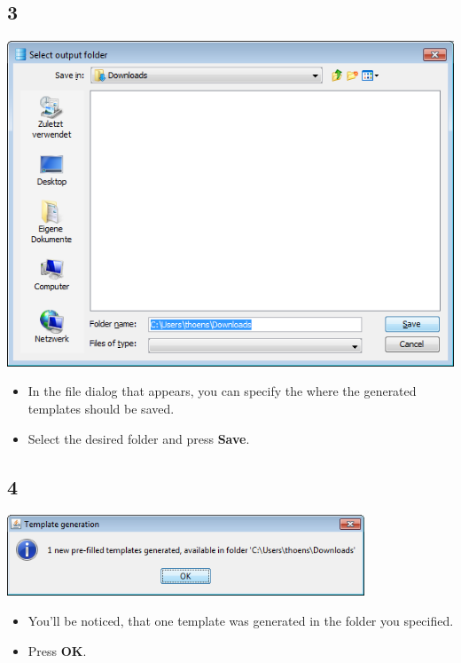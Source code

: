 \documentclass{beamer}
\begin{document}
\subsection{3}
\begin{frame}
	\begin{center}
  		\includegraphics[height=0.5\textheight]{3.png}
	\end{center}
	\begin{itemize}
		\item In the file dialog that appears, you can specify the where the generated templates should be saved.
		\item Select the desired folder and press \textbf{Save}.
	\end{itemize}
\end{frame}

\subsection{4}
\begin{frame}
	\begin{center}
  		\includegraphics[width=0.8\textwidth]{4.png}
	\end{center}
	\begin{itemize}
		\item You'll be noticed, that one template was generated in the folder you specified.
		\item Press \textbf{OK}.
	\end{itemize}
\end{frame}
\end{document}
